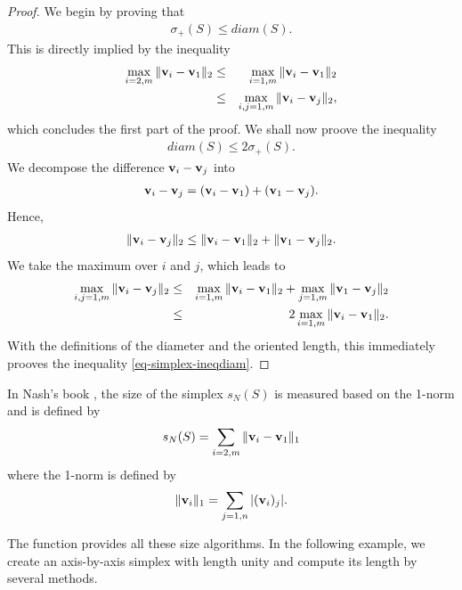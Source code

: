 \begin{proof}
We begin by proving that
\begin{eqnarray}
\sigma_+(S) \leq diam(S).
\end{eqnarray}
This is directly implied by the inequality
\begin{eqnarray}
\max_{i=2,m} \|\mathbf{v}_i - \mathbf{v}_1\|_2
&\leq& \max_{i=1,m} \|\mathbf{v}_i - \mathbf{v}_1\|_2 \\
&\leq& \max_{i,j=1,m} \|\mathbf{v}_i - \mathbf{v}_j\|_2,
\end{eqnarray}
which concludes the first part of the proof.
We shall now proove the inequality 
\begin{eqnarray}
\label{eq-simplex-ineqdiam}
diam(S) \leq 2 \sigma_+(S).
\end{eqnarray}
We decompose the difference 
$\mathbf{v}_i - \mathbf{v}_j$ into 
\begin{eqnarray}
\mathbf{v}_i - \mathbf{v}_j = (\mathbf{v}_i - \mathbf{v}_1)+(\mathbf{v}_1 - \mathbf{v}_j).
\end{eqnarray}
Hence,
\begin{eqnarray}
\| \mathbf{v}_i - \mathbf{v}_j\|_2 \leq \|\mathbf{v}_i - \mathbf{v}_1\|_2
+\| \mathbf{v}_1 - \mathbf{v}_j\|_2.
\end{eqnarray}
We take the maximum over $i$ and $j$,
which leads to
\begin{eqnarray}
\max_{i,j=1,m}\| \mathbf{v}_i - \mathbf{v}_j\|_2 
&\leq& \max_{i=1,m}\|\mathbf{v}_i - \mathbf{v}_1\|_2 
+\max_{j=1,m}\| \mathbf{v}_1 - \mathbf{v}_j\|_2 \\
&\leq& 2 \max_{i=1,m}\|\mathbf{v}_i - \mathbf{v}_1\|_2.
\end{eqnarray}
With the definitions of the diameter
and the oriented length, this immediately 
prooves the inequality 
\ref{eq-simplex-ineqdiam}.
\end{proof}

In Nash's book \cite{nla.cat-vn1060620}, the size of the simplex $s_N(S)$ is measured
based on the 1-norm and is defined by 
\begin{eqnarray}
\label{simplex-sizenash}
s_N(S) = \sum_{i=2,m} \|\mathbf{v}_i - \mathbf{v}_1\|_1
\end{eqnarray}
where the 1-norm is defined by 
\begin{eqnarray}
\label{simplex-sizenash2}
\|\mathbf{v}_i \|_1 = \sum_{j=1,n} |(\mathbf{v}_i)_j|.
\end{eqnarray}

The  function provides all these size algorithms.
In the following example, we create an axis-by-axis simplex 
with length unity and compute its length by several methods.

